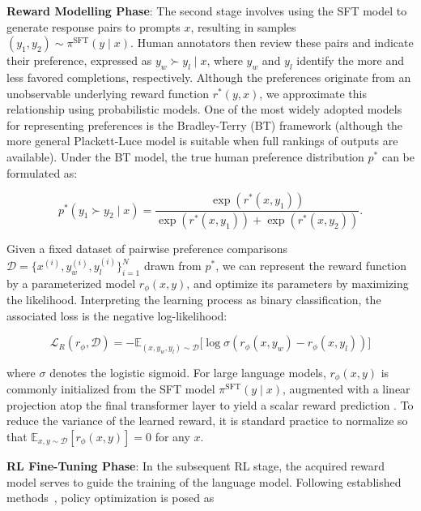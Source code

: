 \textbf{Reward Modelling Phase}: The second stage involves using the SFT model to generate response pairs to prompts $x$, resulting in samples $(y_1, y_2)\sim \pi^\text{SFT}(y \mid x)$. Human annotators then review these pairs and indicate their preference, expressed as $y_w\succ y_l \mid x$, where $y_w$ and $y_l$ identify the more and less favored completions, respectively. Although the preferences originate from an unobservable underlying reward function $r^*(y, x)$, we approximate this relationship using probabilistic models. One of the most widely adopted models for representing preferences is the Bradley-Terry (BT) framework \cite{bradley1952rankanalysis} (although the more general Plackett-Luce model \citep{plackett1975analysis, luce2012individual} is suitable when full rankings of outputs are available). Under the BT model, the true human preference distribution $p^*$ can be formulated as:

\begin{equation}\label{eq:bradley-terry}
    p^*(y_1\succ y_2 \mid x)=\frac{\exp\left(r^*(x, y_1)\right)}{\exp\left(r^*(x, y_1)\right) + \exp\left(r^*(x, y_2)\right)}.
\end{equation}

Given a fixed dataset of pairwise preference comparisons $\mathcal{D}=\bigl\{x^{(i)}, y_w^{(i)}, y_l^{(i)}\bigr\}_{i=1}^N$ drawn from $p^*$, we can represent the reward function by a parameterized model $r_{\phi}(x, y)$, and optimize its parameters by maximizing the likelihood. Interpreting the learning process as binary classification, the associated loss is the negative log-likelihood:

\begin{equation}\label{eq:reward_model}
    \mathcal{L}_R(r_{\phi}, \mathcal{D}) = -\mathbb{E}_{(x, y_w, y_l)\sim \mathcal{D}}\bigl[\log \sigma(r_{\phi}(x, y_w)- r_{\phi}(x, y_l))\bigr]
\end{equation}

where $\sigma$ denotes the logistic sigmoid. For large language models, $r_{\phi}(x, y)$ is commonly initialized from the SFT model $\pi^\text{SFT}(y \mid x)$, augmented with a linear projection atop the final transformer layer to yield a scalar reward prediction \cite{ziegler2020finetuning}. To reduce the variance of the learned reward, it is standard practice to normalize so that $\mathbb{E}_{x,y\sim \mathcal{D}}\left[r_\phi(x, y)\right] = 0$ for any $x$.

\textbf{RL Fine-Tuning Phase}: In the subsequent RL stage, the acquired reward model serves to guide the training of the language model. Following established methods~\citep{jaques2017sequence, jaques2020human}, policy optimization is posed as

